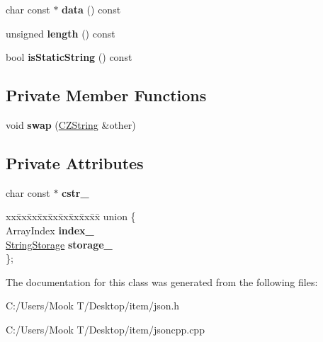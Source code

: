 \begin{DoxyCompactItemize}
\item 
\hypertarget{class_json_1_1_value_1_1_c_z_string_a02482793b88b1062c4a0dd0a53f3d2a7}{}char const $\ast$ {\bfseries data} () const \label{class_json_1_1_value_1_1_c_z_string_a02482793b88b1062c4a0dd0a53f3d2a7}

\item 
\hypertarget{class_json_1_1_value_1_1_c_z_string_a4e697840c41fb56756be7a75efa114cb}{}unsigned {\bfseries length} () const \label{class_json_1_1_value_1_1_c_z_string_a4e697840c41fb56756be7a75efa114cb}

\item 
\hypertarget{class_json_1_1_value_1_1_c_z_string_af3cc02b77c2cd79d4646fcea3575c1fd}{}bool {\bfseries is\+Static\+String} () const \label{class_json_1_1_value_1_1_c_z_string_af3cc02b77c2cd79d4646fcea3575c1fd}

\end{DoxyCompactItemize}
\subsection*{Private Member Functions}
\begin{DoxyCompactItemize}
\item 
\hypertarget{class_json_1_1_value_1_1_c_z_string_ad59f3542d2eea749a6a63409d1a02207}{}void {\bfseries swap} (\hyperlink{class_json_1_1_value_1_1_c_z_string}{C\+Z\+String} \&other)\label{class_json_1_1_value_1_1_c_z_string_ad59f3542d2eea749a6a63409d1a02207}

\end{DoxyCompactItemize}
\subsection*{Private Attributes}
\begin{DoxyCompactItemize}
\item 
\hypertarget{class_json_1_1_value_1_1_c_z_string_a5b4d28349294034d7f779c3c95d0306c}{}char const $\ast$ {\bfseries cstr\+\_\+}\label{class_json_1_1_value_1_1_c_z_string_a5b4d28349294034d7f779c3c95d0306c}

\item 
\hypertarget{class_json_1_1_value_1_1_c_z_string_a6f6b20ee7c8873fba58100f869ca2e5e}{}\begin{tabbing}
xx\=xx\=xx\=xx\=xx\=xx\=xx\=xx\=xx\=\kill
union \{\\
\>ArrayIndex {\bfseries index\_}\\
\>\hyperlink{struct_json_1_1_value_1_1_c_z_string_1_1_string_storage}{StringStorage} {\bfseries storage\_}\\
\}; \label{class_json_1_1_value_1_1_c_z_string_a6f6b20ee7c8873fba58100f869ca2e5e}
\\

\end{tabbing}\end{DoxyCompactItemize}


The documentation for this class was generated from the following files\+:\begin{DoxyCompactItemize}
\item 
C\+:/\+Users/\+Mook T/\+Desktop/item/json.\+h\item 
C\+:/\+Users/\+Mook T/\+Desktop/item/jsoncpp.\+cpp\end{DoxyCompactItemize}
